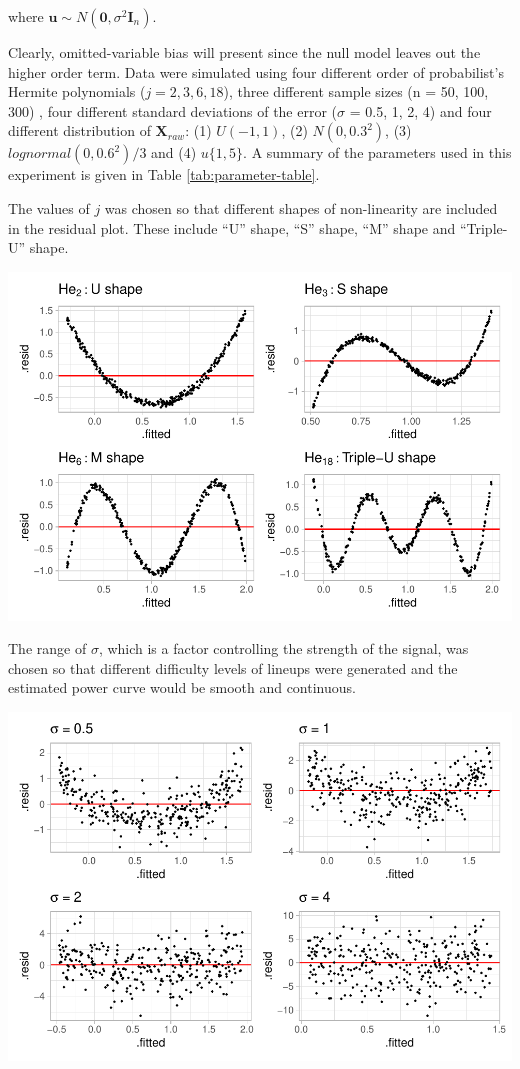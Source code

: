 \documentclass[]{interact}
\theoremstyle{plain}%
\theoremstyle{definition}
\theoremstyle{remark}
\begin{document}
where
\(\boldsymbol{u} \sim N(\boldsymbol{0}, \sigma^2\boldsymbol{I}_n)\).

Clearly, omitted-variable bias will present since the null model leaves
out the higher order term. Data were simulated using four different
order of probabilist's Hermite polynomials (\(j = 2, 3, 6, 18\)), three
different sample sizes (n = 50, 100, 300) , four different standard
deviations of the error (\(\sigma\) = 0.5, 1, 2, 4) and four different
distribution of \(\boldsymbol{X}_{raw}\): (1) \(U(-1, 1)\), (2)
\(N(0, 0.3^2)\), (3) \(lognormal(0, 0.6^2)/3\) and (4) \(u\{1, 5\}\). A
summary of the parameters used in this experiment is given in Table
\ref{tab:parameter-table}.

The values of \(j\) was chosen so that different shapes of non-linearity
are included in the residual plot. These include ``U'' shape, ``S''
shape, ``M'' shape and ``Triple-U'' shape.

\includegraphics{paper_comparison_files/figure-latex/different-shape-of-herimite-1.pdf}

The range of \(\sigma\), which is a factor controlling the strength of
the signal, was chosen so that different difficulty levels of lineups
were generated and the estimated power curve would be smooth and
continuous.

\includegraphics{paper_comparison_files/figure-latex/different-sigma-1.pdf}
\end{document}
